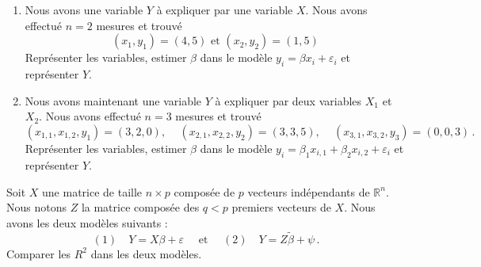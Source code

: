 \documentclass{../td_um}
\providecommand{\1}{\mathds{1}}
\begin{document}
	\exo{}
	\begin{enumerate}
		\item Nous avons une variable $Y$ à expliquer par une variable $X$. Nous avons effectué $n=2$ mesures et trouvé
		\[
		\left(x_{1}, y_{1}\right)=(4,5) \text { et }\left(x_{2}, y_{2}\right)=(1,5)
		\]
		Représenter les variables, estimer $\beta$ dans le modèle $y_{i}=\beta x_{i}+\varepsilon_{i}$ et représenter $\hat{Y}$.
		\item Nous avons maintenant une variable $Y$ à expliquer par deux variables $X_{1}$ et $X_{2}$. Nous avons effectué $n=3$ mesures et trouvé
		\[
		(x_{1,1}, x_{1,2},y_{1})=(3,2,0),\,\quad
		(x_{2,1}, x_{2,2}, y_{2})=(3,3,5),\,\quad
		(x_{3,1}, x_{3,2}, y_{3})=(0,0,3)\,.
		\]
		Représenter les variables, estimer $\beta$ dans le modèle $y_{i}=\beta_{1} x_{i, 1}+\beta_{2} x_{i, 2}+\varepsilon_{i}$ et représenter $\hat{Y}$.
	\end{enumerate}
	
	\cor{\newpage}
	
	\exo{} Soit $X$ une matrice de taille $n \times p$ composée de $p$ vecteurs indépendants de $\mathbb{R}^{n}$. Nous notons $Z$ la matrice composée des $q < p$ premiers vecteurs de $X$. Nous avons les deux modèles suivants :
	\[
	(1) \quad Y=X \beta+\varepsilon \quad \text { et } \quad (2) \quad Y=Z \tilde \beta+\psi\,.
	\]
	Comparer les $R^{2}$ dans les deux modèles.

\cor{\newpage}
\end{document}
